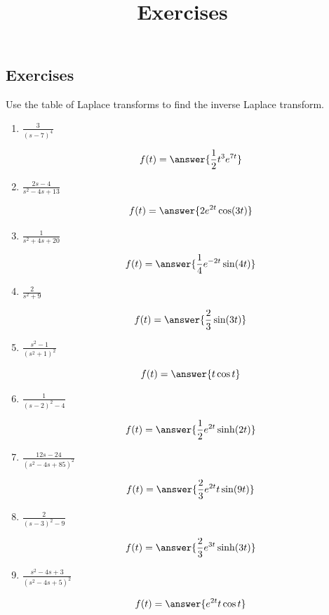 \documentclass{ximera}
\title{Exercises} \license{CC BY-NC-SA 4.0}
\begin{document}
\begin{abstract}
\end{abstract}
\maketitle

\begin{onlineOnly}
\section*{Exercises}
\end{onlineOnly}

\begin{problem}\label{exer:8.2.1}
 Use the table of Laplace transforms  to find the inverse Laplace
transform.

\begin{enumerate}
    \item $\frac{3}{(s-7)^4}$

$$f(t)=\answer{\frac{1}{2}t^3e^{7t}}$$
    
    \item $\frac{2s-4}{s^2-4s+13}$

$$f(t)=\answer{2e^{2t}\cos(3t)}$$
    
    \item $\frac{1}{s^2+4s+20}$

$$f(t)=\answer{\frac{1}{4}e^{-2t}\sin(4t)}$$
    
    \item $\frac{2}{s^2+9}$

$$f(t)=\answer{\frac{2}{3}\sin(3t)}$$
    
    \item $\frac{s^2-1}{(s^2+1)^2}$

$$f(t)=\answer{t\cos{t}}$$
    
    \item $\frac{1}{(s-2)^2-4}$

$$f(t)=\answer{\frac{1}{2}e^{2t}\sinh(2t)}$$
    
    \item $\frac{12s-24}{(s^2-4s+85)^2}$

$$f(t)=\answer{\frac{2}{3}e^{2t}t\sin(9t)}$$
  
    \item $\frac{2}{(s-3)^2-9}$

$$f(t)=\answer{\frac{2}{3}e^{3t}\sinh(3t)}$$
 
    \item $\frac{s^2-4s+3}{(s^2-4s+5)^2}$

$$f(t)=\answer{e^{2t}t\cos{t}}$$
 
\end{enumerate}
\end{problem}
\end{document}
